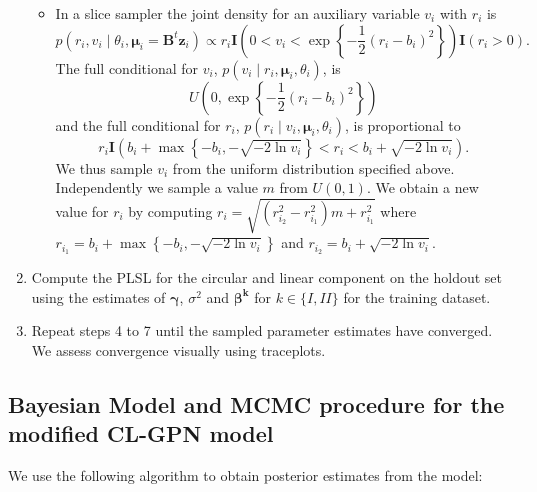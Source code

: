 \documentclass[12pt,]{article}
\begin{document}
\begin{enumerate}
\begin{itemize}
\item In a slice sampler the joint density for an auxiliary variable $v_{i}$ with $r_{i}$ is
$$p(r_{i}, v_{i}\mid \theta_{i}, \boldsymbol{\mu}_{i}=\boldsymbol{B}^t\boldsymbol{z}_{i}) \propto r_{i} \textbf{I}\left(0 < v_i < \exp\left\{ -\frac{1}{2}(r_{i} - b_{i})^2\right\}\right)\textbf{I}(r_i > 0).$$
\noindent The full conditional for $v_{i}$, $p(v_{i} \mid r_{i},\boldsymbol{\mu}_{i}, \theta_{i})$, is
$$U\left(0, \exp\left\{-\frac{1}{2}(r_{i} -  b _{i})^2\right\}\right)$$
and the full conditional for $r_i$, $p(r_{i} \mid v_{i},\boldsymbol{\mu}_{i}, \theta_{i})$, is proportional to
$$r_{i} \textbf{I}\left(b_{i} + \max\left\{-b_{i}, -\sqrt{-2\ln v_{i}}\right\} < r_{i} < b_{i} + \sqrt{-2\ln v_{i}}\right).$$
\noindent We thus sample $v_{i}$ from the uniform distribution specified above. Independently we sample a value $m$ from $U(0,1)$. We obtain a new value for $r_{i}$ by computing $ r_{i} = \sqrt{(r_{i_{2}}^{2}-r_{i_{1}}^{2})m + r_{i_{1}}^{2}}$ where $r_{i_{1}}=b_{i} +\max\left\{-b_{i}, -\sqrt{-2\ln v_{i}}\right\}$ and $ r_{i_{2}}= b_{i} + \sqrt{-2\ln v_{i}}$.
\end{itemize}
\item Compute the PLSL for the circular and linear component on the holdout set using the estimates of $\boldsymbol{\gamma}$, $\sigma^2$ and $\boldsymbol{\beta^{k}}$ for $k \in \{I,II\}$ for the training dataset.
\item Repeat steps 4 to 7 until the sampled parameter estimates have converged. We assess convergence visually using traceplots.
\end{enumerate}

\newpage
\subsection{Bayesian Model and MCMC procedure for the modified CL-GPN model}\label{A2}

We use the following algorithm to obtain posterior estimates from the
model:
\end{document}
